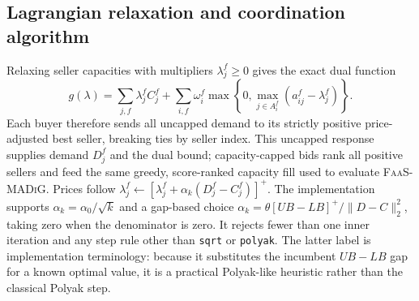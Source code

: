 \subsection{Lagrangian relaxation and coordination algorithm}
Relaxing seller capacities with multipliers $\lambda_j^f\geq0$ gives the exact
dual function
\begin{equation}
 g(\lambda)=\sum_{j,f}\lambda_j^fC_j^f+
 \sum_{i,f}\omega_i^f\max\!\left\{0,\max_{j\in A_i^f}
 (a_{ij}^f-\lambda_j^f)\right\}.
\end{equation}
Each buyer therefore sends all uncapped demand to its strictly positive
price-adjusted best seller, breaking ties by seller index. This uncapped
response supplies demand $D_j^f$ and the dual bound; capacity-capped bids rank
all positive sellers and feed the same greedy, score-ranked capacity fill used
to evaluate \textsc{FaaS-MADiG}. Prices follow
$\lambda_j^f\leftarrow[\lambda_j^f+\alpha_k(D_j^f-C_j^f)]^+$.
The implementation supports $\alpha_k=\alpha_0/\sqrt{k}$ and a gap-based choice
$\alpha_k=\theta[UB-LB]^+/\|D-C\|_2^2$, taking zero when the denominator is
zero. It rejects fewer than one inner iteration and any step rule other than
\texttt{sqrt} or \texttt{polyak}. The latter label is implementation
terminology: because it substitutes the incumbent $UB-LB$ gap for a known
optimal value, it is a practical Polyak-like heuristic rather than the
classical Polyak step.

